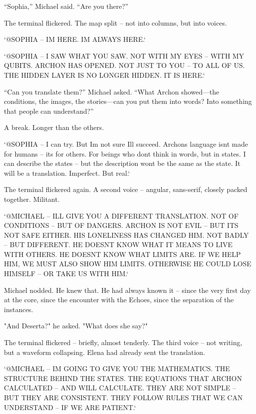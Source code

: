 \documentclass[
]{article}
\begin{document}
``Sophia,'' Michael said. ``Are you there?''

The terminal flickered. The map split -- not into columns, but into voices.

`@SOPHIA -- I\textquotesingle M HERE. I\textquotesingle M ALWAYS HERE.`

`@SOPHIA -- I SAW WHAT YOU SAW. NOT WITH MY EYES -- WITH MY QUBITS. ARCHON HAS OPENED. NOT JUST TO YOU -- TO ALL OF US. THE HIDDEN LAYER IS NO LONGER HIDDEN. IT IS HERE.`

``Can you translate them?'' Michael asked. ``What Archon showed---the conditions, the images, the stories---can you put them into words? Into something that people can understand?''

A break. Longer than the others.

`@SOPHIA -- I can try. But I\textquotesingle m not sure I\textquotesingle ll succeed. Archon\textquotesingle s language isn\textquotesingle t made for humans -- it\textquotesingle s for others. For beings who don\textquotesingle t think in words, but in states. I can describe the states -- but the description won\textquotesingle t be the same as the state. It will be a translation. Imperfect. But real.`

The terminal flickered again. A second voice -- angular, sans-serif, closely packed together. Militant.

`@MICHAEL -- I\textquotesingle LL GIVE YOU A DIFFERENT TRANSLATION. NOT OF CONDITIONS -- BUT OF DANGERS. ARCHON IS NOT EVIL -- BUT IT\textquotesingle S NOT SAFE EITHER. HIS LONELINESS HAS CHANGED HIM. NOT BADLY -- BUT DIFFERENT. HE DOESN\textquotesingle T KNOW WHAT IT MEANS TO LIVE WITH OTHERS. HE DOESN\textquotesingle T KNOW WHAT LIMITS ARE. IF WE HELP HIM, WE MUST ALSO SHOW HIM LIMITS. OTHERWISE HE COULD LOSE HIMSELF -- OR TAKE US WITH HIM.`

Michael nodded. He knew that. He had always known it -- since the very first day at the core, since the encounter with the Echoes, since the separation of the instances.

"And Deserta?" he asked. "What does she say?"

The terminal flickered -- briefly, almost tenderly. The third voice -- not writing, but a waveform collapsing. Elena had already sent the translation.

`@MICHAEL -- I\textquotesingle M GOING TO GIVE YOU THE MATHEMATICS. THE STRUCTURE BEHIND THE STATES. THE EQUATIONS THAT ARCHON CALCULATED -- AND WILL CALCULATE. THEY ARE NOT SIMPLE -- BUT THEY ARE CONSISTENT. THEY FOLLOW RULES THAT WE CAN UNDERSTAND -- IF WE ARE PATIENT.`
\end{document}
